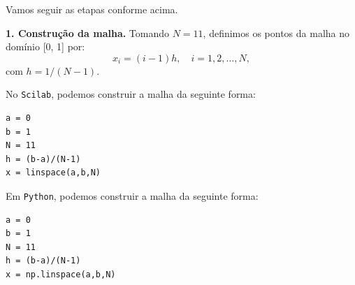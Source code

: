 \begin{sol} Vamos seguir as etapas conforme acima.

  {\bf 1. Construção da malha.} Tomando $N=11$, definimos os pontos da malha no domínio [0, 1] por:
  \begin{equation*}
    x_i = (i-1)h,\quad i=1, 2, \dotsc, N,
  \end{equation*}
com $h = 1/(N-1)$.

\ifisscilab
No \verb+Scilab+, podemos construir a malha da seguinte forma:
\begin{verbatim}
a = 0
b = 1
N = 11
h = (b-a)/(N-1)
x = linspace(a,b,N)
\end{verbatim}
\fi
\ifispython
Em \verb+Python+, podemos construir a malha da seguinte forma:
\begin{verbatim}
a = 0
b = 1
N = 11
h = (b-a)/(N-1)
x = np.linspace(a,b,N)
\end{verbatim}
\fi


\end{sol}
